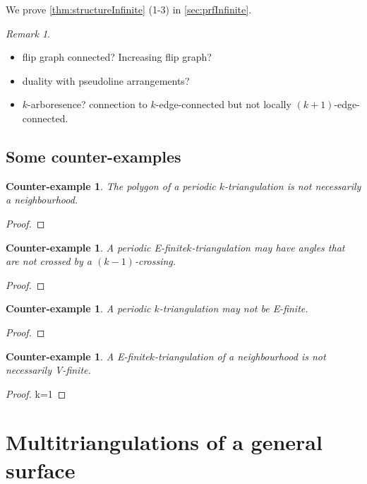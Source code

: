 \documentclass{amsart}
\newtheorem{ce}[theorem]{Counter-example}
\theoremstyle{remark}
\newtheorem{remark}{Remark}[section]
\newcommand*{\nbd}[0]{neighbourhood\xspace}
\newcommand*{\ef}[0]{E-finite\xspace}
\newcommand*{\vf}[0]{V-finite\xspace}
\newcommand*{\ktg}[0]{$k$-triangulation\xspace}
\begin{document}
We prove \cref{thm:structureInfinite} (1-3) in \cref{sec:prfInfinite}.

\begin{remark}
\begin{itemize}
\item flip graph connected? Increasing flip graph?
\item duality with pseudoline arrangements?
\item $k$-arboresence? connection to $k$-edge-connected but not locally $(k+1)$-edge-connected.
\end{itemize}
\end{remark}


\subsection{Some counter-examples}

\begin{ce}
The polygon of a periodic \ktg is not necessarily a \nbd.
\end{ce}
\begin{proof}

\end{proof}

\begin{ce}
A periodic \ef \ktg may have angles that are not crossed by a $(k-1)$-crossing.
\end{ce}
\begin{proof}

\end{proof}

\begin{ce} 
A periodic \ktg may not be \ef.
\end{ce}
\begin{proof}

\end{proof}

\begin{ce}
A \ef \ktg of a \nbd is not necessarily \vf.
\end{ce}
\begin{proof}
k=1
\end{proof}


\section{Multitriangulations of a general surface}
\end{document}
